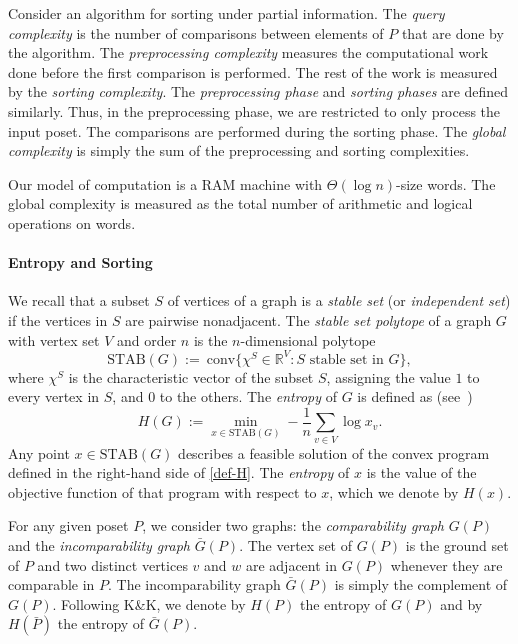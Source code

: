\documentclass{article} \usepackage{fullpage}
\newcommand{\STAB}{\mathrm{STAB}}
\newcommand{\ent}{H}
\begin{document}
Consider an algorithm for sorting under partial information. The {\sl query complexity\/} is the number of comparisons between elements of $P$ that are done by the algorithm. The {\sl preprocessing complexity\/} measures the computational work done before the first comparison is performed. The rest of the work is measured by the {\sl sorting complexity}. The {\sl preprocessing phase\/} and {\sl sorting phases\/} are defined similarly. Thus, in the preprocessing phase, we are restricted to only process the input poset. The comparisons are performed during the sorting phase. The {\sl global complexity\/} is simply the sum of the preprocessing and sorting complexities.

Our model of computation is a RAM machine with $\Theta (\log n)$-size words. The global complexity is measured as the total number of arithmetic and logical operations on words.

\paragraph*{Entropy and Sorting}

We recall that a subset $S$ of vertices of a graph is a {\sl stable set\/} (or {\sl independent set}) if the vertices in $S$ are pairwise nonadjacent. The {\sl stable set polytope\/} of a graph $G$ with vertex set $V$ and order $n$ is the $n$-dimensional polytope
\begin{equation*}
\STAB(G) := \mathrm{\ conv} \{\chi^S \in \mathbb{R}^V : S \textrm{ stable set in }G\},
\end{equation*}
where $\chi^S$ is the characteristic vector of the subset $S$, assigning the value $1$ to every vertex in $S$, and $0$ to the others. The {\sl entropy\/} of $G$ is defined as (see~\cite{K73,CKLMS90})
\begin{equation}
\label{def-H}
H(G) := \min_{x\in \STAB(G)} - \frac 1n \sum_{v\in V} \log x_v.
\end{equation}
Any point $x \in \STAB(G)$ describes a feasible solution of the convex program defined in the right-hand side of \eqref{def-H}. The {\sl entropy\/} of $x$ is the value of the objective function of that program with respect to $x$, which we denote by $\ent(x)$.

For any given poset $P$, we consider two graphs: the {\sl comparability graph\/} $G(P)$ and the {\sl incomparability graph\/} $\bar{G}(P)$. The vertex set of $G(P)$ is the ground set of $P$ and two distinct vertices $v$ and $w$ are adjacent in $G(P)$ whenever they are comparable in $P$. The incomparability graph $\bar{G}(P)$ is simply the complement of $G(P)$. Following K\&K, we denote by $H(P)$ the entropy of $G(P)$ and by $H(\bar{P})$ the entropy of $\bar{G}(P)$.
\end{document}

